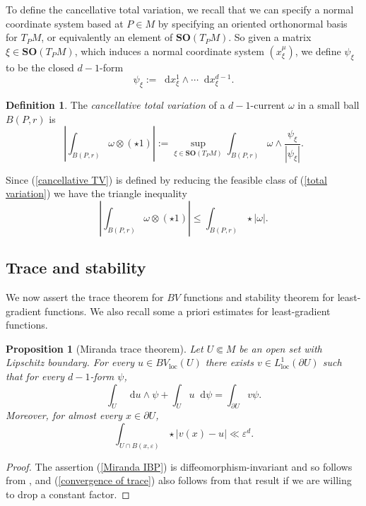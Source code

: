 \documentclass[reqno,12pt,letterpaper]{amsart}
\newcommand{\SpOrth}{\mathbf{SO}}
\newcommand*\dif{\mathop{}\!\mathrm{d}}
\newcommand{\dfn}[1]{\emph{#1}\index{#1}}
\newcommand{\loc}{\mathrm{loc}}
\newtheorem{proposition}[theorem]{Proposition}
\theoremstyle{definition}
\newtheorem{definition}[theorem]{Definition}
\numberwithin{equation}{section}
\begin{document}
To define the cancellative total variation, we recall that we can specify a normal coordinate system based at $P \in M$ by specifying an oriented orthonormal basis for $T_PM$, or equivalently an element of $\SpOrth(T_PM)$.
So given a matrix $\xi \in \SpOrth(T_PM)$, which induces a normal coordinate system $(x^\mu_\xi)$, we define $\psi_\xi$ to be the closed $d-1$-form
$$\psi_\xi := \dif x^1_\xi \wedge \cdots \dif x^{d - 1}_\xi.$$

\begin{definition}
The \dfn{cancellative total variation} of a $d-1$-current $\omega$ in a small ball $B(P, r)$ is 
\begin{equation}\label{cancellative TV}
\left|\int_{B(P, r)} \omega \otimes (\star 1)\right| := \sup_{\xi \in \SpOrth(T_PM)} \int_{B(P, r)} \omega \wedge \frac{\psi_\xi}{|\psi_\xi|}.
\end{equation}
\end{definition}

Since (\ref{cancellative TV}) is defined by reducing the feasible class of (\ref{total variation}) we have the triangle inequality 
\begin{equation}\label{triangle TV}
\left|\int_{B(P, r)} \omega \otimes (\star 1)\right| \leq \int_{B(P, r)} \star |\omega|.
\end{equation}


\subsection{Trace and stability}
We now assert the trace theorem for $BV$ functions and stability theorem for least-gradient functions.
We also recall some a priori estimates for least-gradient functions.

\begin{proposition}[Miranda trace theorem]\label{traces}
Let $U \Subset M$ be an open set with Lipschitz boundary.
For every $u \in BV_\loc(U)$ there exists $v \in L^1_\loc(\partial U)$ such that for every $d-1$-form $\psi$,
\begin{equation}\label{Miranda IBP}
\int_U \dif u \wedge \psi + \int_U u \dif \psi = \int_{\partial U} v\psi.
\end{equation}
Moreover, for almost every $x \in \partial U$,
\begin{equation}\label{convergence of trace}
\int_{U \cap B(x, \varepsilon)} \star |v(x) - u| \ll \varepsilon^d.
\end{equation}
\end{proposition}
\begin{proof}
The assertion (\ref{Miranda IBP}) is diffeomorphism-invariant and so follows from \cite[Teorema 1]{Miranda67}, and (\ref{convergence of trace}) also follows from that result if we are willing to drop a constant factor.
\end{proof}
\end{document}
